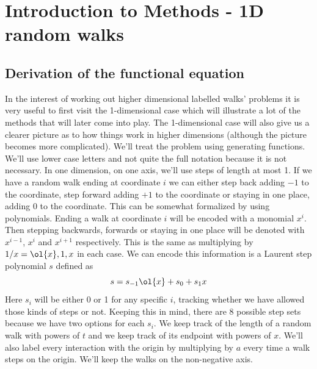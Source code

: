 
\chapter{Introduction to Methods - 1D random walks}
\label{ch:IntroToMethods}

\section{Derivation of the functional equation}
\label{sec:DerFxnEqn}

In the interest of working out higher dimensional labelled walks' problems it is very useful to first visit the 1-dimensional case which will illustrate a lot of the methods that will later come into play. The 1-dimensional case will also give us a clearer picture as to how things work in higher dimensions (although the picture becomes more complicated). We'll treat the problem using generating functions. We'll use lower case letters and not quite the full notation because it is not necessary. In one dimension, on one axis, we'll use steps of length at most 1. If we have a random walk ending at coordinate $i$ we can either step back adding $-1$ to the coordinate, step forward adding $+1$ to the coordinate or staying in one place, adding $0$ to the coordinate. This can be somewhat formalized by using polynomials. Ending a walk at coordinate $i$ will be encoded with a monomial $x^i$. Then stepping backwards, forwards or staying in one place will be denoted with $x^{i-1}$, $x^i$ and $x^{i+1}$ respectively. This is the same as multiplying by $1/x = \ol{x}, 1, x$ in each case. We can encode this information is a Laurent step polynomial $s$ defined as
\[
	s = s_{-1}\ol{x} + s_0 + s_1 x
\]
Here $s_i$ will be either 0 or 1 for any specific $i$, tracking whether we have allowed those kinds of steps or not. Keeping this in mind, there are 8 possible step sets because we have two options for each $s_i$. We keep track of the length of a random walk with powers of $t$ and we keep track of its endpoint with powers of $x$. We'll also label every interaction with the origin by multiplying by $a$ every time a walk steps on the origin. We'll keep the walks on the non-negative axis.


